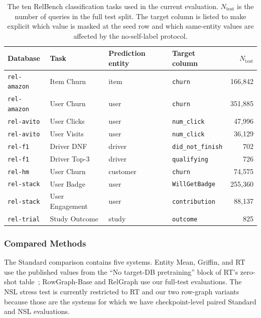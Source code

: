 \begin{table}[t]
  \centering
  \caption{The ten RelBench classification tasks used in the current
  evaluation. \(N_{\mathrm{test}}\) is the number of queries in the full
  test split. The target column is listed to make explicit which value is
  masked at the seed row and which same-entity values are affected by the
  no-self-label protocol.}
  \label{tab:exp:tasks}
  \footnotesize
  \setlength{\tabcolsep}{4pt}
  \begin{tabular}{llllr}
    \toprule
    Database & Task & Prediction entity & Target column &
    \(N_{\mathrm{test}}\) \\
    \midrule
    \texttt{rel-amazon} & Item Churn & item & \texttt{churn} & 166,842 \\
    \texttt{rel-amazon} & User Churn & user & \texttt{churn} & 351,885 \\
    \texttt{rel-avito} & User Clicks & user & \texttt{num\_click} & 47,996 \\
    \texttt{rel-avito} & User Visits & user & \texttt{num\_click} & 36,129 \\
    \texttt{rel-f1} & Driver DNF & driver & \texttt{did\_not\_finish} & 702 \\
    \texttt{rel-f1} & Driver Top-3 & driver & \texttt{qualifying} & 726 \\
    \texttt{rel-hm} & User Churn & customer & \texttt{churn} & 74,575 \\
    \texttt{rel-stack} & User Badge & user & \texttt{WillGetBadge} & 255,360 \\
    \texttt{rel-stack} & User Engagement & user & \texttt{contribution} & 88,137 \\
    \texttt{rel-trial} & Study Outcome & study & \texttt{outcome} & 825 \\
    \bottomrule
  \end{tabular}
\end{table}

\subsubsection{Compared Methods}
\label{sec:exp:methods}

The Standard comparison contains five systems. Entity Mean, Griffin, and
RT use the published values from the ``No target-DB pretraining'' block of
RT's zero-shot table~\citep{ranjan2026rt}; RowGraph-Base and RelGraph use
our full-test evaluations. The NSL stress test is currently restricted to
RT and our two row-graph variants because those are the systems for which
we have checkpoint-level paired Standard and NSL evaluations.

